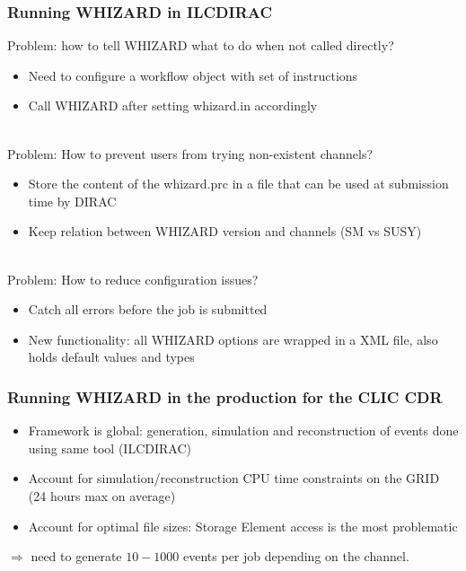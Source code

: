 \documentclass{beamer}
\newcommand{\whizard}{WHIZARD\xspace}
\begin{document}
\begin{frame}
\frametitle{Running \whizard in ILCDIRAC}
Problem: how to tell \whizard what to do when not called directly?
\begin{itemize}
  \item Need to  configure a workflow object with set of instructions
  \item Call \whizard after setting whizard.in accordingly
\end{itemize}
~\\
Problem: How to prevent users from trying non-existent channels?
\begin{itemize}
  \item Store the content of the whizard.prc in a file that can be used at
  submission time by DIRAC
  \item Keep relation between \whizard version and channels (SM vs SUSY)
\end{itemize}
~\\
Problem: How to reduce configuration issues?
\begin{itemize}
  \item Catch all errors before the job is submitted
  \item New functionality: all \whizard options are wrapped in a
  XML file, also holds default values and types
\end{itemize}
\end{frame}

\begin{frame}
\frametitle{Running \whizard in the production for the CLIC CDR}
\begin{itemize}
  \item Framework is global: generation, simulation and reconstruction of events
  done using same tool (ILCDIRAC)
  \item Account for simulation/reconstruction CPU time constraints on the GRID
  (24 hours max on average)
  \item Account for optimal file sizes: Storage Element access is the most
  problematic
\end{itemize}
$\Rightarrow$ \alert{need to generate $10-1000$ events per job} depending on the
channel.
\end{frame}
\end{document}
